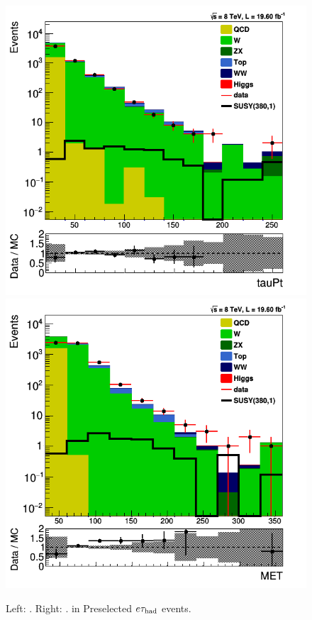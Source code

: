 \begin{figure}[htbp]
\centering
\includegraphics[angle=0,scale=0.35]{SelectionEleTau/TauPt.png}
\includegraphics[angle=0,scale=0.35]{SelectionEleTau/MET.png}
\caption{Left: \Tau\PT. Right: \MET. in Preselected $e\tau_{\rm had}$ events.}
\label{fig:datamceletau}
\end{figure}


